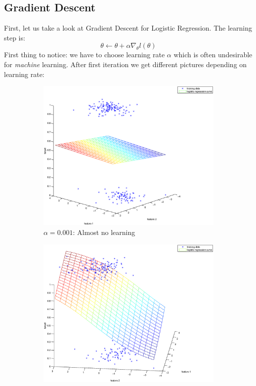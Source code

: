 \documentclass{article}
\begin{document}
	\subsection{Gradient Descent}
	First, let us take a look at Gradient Descent for Logistic Regression. The learning step is:
	$$\theta \leftarrow \theta + \alpha  \nabla_\theta l(\theta)$$
	First thing to notice: we have to choose learning rate $\alpha$ which is often undesirable for \textit{machine} learning. After first iteration we get different pictures depending on learning rate:
	\begin{figure}[h]
		\centering
		\begin{subfigure}{.5\textwidth}
			\centering
			\includegraphics[width=.9\linewidth]{lr_provided_start_001.eps}
			\caption{$\alpha = 0.001$: Almost no learning}
			\label{fig:sub1}
		\end{subfigure}%
		\begin{subfigure}{.5\textwidth}
			\centering
			\includegraphics[width=.9\linewidth]{lr_provided_start_01.eps}

\end{subfigure}
\end{figure}
\end{document}
